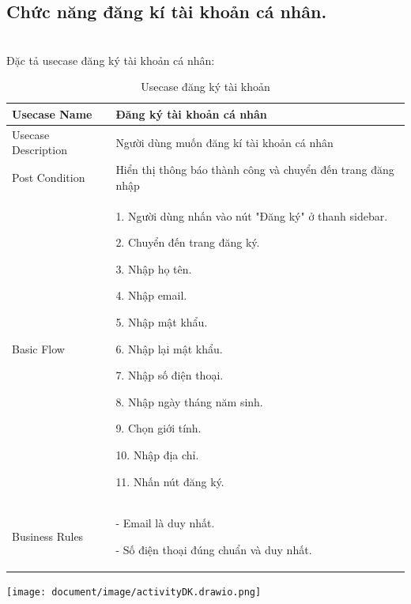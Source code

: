 \subsection{Chức năng đăng kí tài khoản cá nhân.}\\
 Đặc tả usecase đăng ký tài khoản cá nhân:  

\begin{table}[H]
    \centering
	\begin{tabular}{|p{5cm}|p{10cm}|}
    \hline
    Usecase Name&Đăng ký tài khoản cá nhân\\
    \hline
    Usecase Description&Người dùng muốn đăng kí tài khoản cá nhân\\
    \hline
    Post Condition&Hiển thị thông báo thành công và chuyển đến trang đăng nhập\\
    \hline
    Basic Flow& 1. Người dùng nhấn vào nút "Đăng ký" ở thanh sidebar.
    
    2. Chuyển đến trang đăng ký.
    
    3. Nhập họ tên.
    
    4. Nhập email.
    
    5. Nhập mật khẩu.
    
    6. Nhập lại mật khẩu.
    
    7. Nhập số điện thoại.
    
    8. Nhập ngày tháng năm sinh.
    
    9. Chọn giới tính.
    
    10. Nhập địa chỉ.
    
    11. Nhấn nút đăng ký.\\
    \hline Business Rules&- Email là duy nhất.
    
    - Số điện thoại đúng chuẩn và duy nhất.\\
   
   
	\hline
\end{tabular}
\caption{Usecase đăng ký tài khoản }
\end{table}

\begin{center}
    \captionsetup{type=figure}
    \texttt{[image: document/image/activityDK.drawio.png]}
\end{center}

